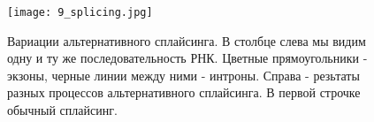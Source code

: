 \begin{figure}[H]
    \centering
    \texttt{[image: 9\_splicing.jpg]}
    \caption{Вариации альтернативного сплайсинга. В столбце слева мы видим одну и ту же последовательность РНК. Цветные прямоугольники - экзоны, черные линии между ними - интроны. Справа - резьтаты разных процессов альтернативного сплайсинга. В первой строчке обычный сплайсинг.}
    \label{fig:9_splicing}
\end{figure}

